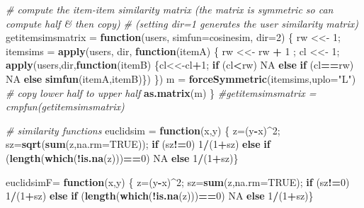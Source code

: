 \documentclass[]{article}
\newenvironment{Shaded}{\begin{snugshade}}{\end{snugshade}}
\newcommand{\CommentTok}[1]{\textcolor[rgb]{0.56,0.35,0.01}{\textit{#1}}}
\newcommand{\ControlFlowTok}[1]{\textcolor[rgb]{0.13,0.29,0.53}{\textbf{#1}}}
\newcommand{\DataTypeTok}[1]{\textcolor[rgb]{0.13,0.29,0.53}{#1}}
\newcommand{\DecValTok}[1]{\textcolor[rgb]{0.00,0.00,0.81}{#1}}
\newcommand{\KeywordTok}[1]{\textcolor[rgb]{0.13,0.29,0.53}{\textbf{#1}}}
\newcommand{\NormalTok}[1]{#1}
\newcommand{\OperatorTok}[1]{\textcolor[rgb]{0.81,0.36,0.00}{\textbf{#1}}}
\newcommand{\OtherTok}[1]{\textcolor[rgb]{0.56,0.35,0.01}{#1}}
\newcommand{\StringTok}[1]{\textcolor[rgb]{0.31,0.60,0.02}{#1}}
\begin{document}
\begin{Shaded}
\begin{Highlighting}[]
\CommentTok{# compute the item-item similarity matrix (the matrix is symmetric so can compute half & then copy)}
\CommentTok{# (setting dir=1 generates the user similarity matrix)}
\NormalTok{getitemsimsmatrix =}\StringTok{ }\ControlFlowTok{function}\NormalTok{(users, }\DataTypeTok{simfun=}\NormalTok{cosinesim, }\DataTypeTok{dir=}\DecValTok{2}\NormalTok{) \{}
\NormalTok{  rw <<-}\StringTok{ }\DecValTok{1}\NormalTok{; }
\NormalTok{  itemsims =}\StringTok{ }\KeywordTok{apply}\NormalTok{(users, dir, }\ControlFlowTok{function}\NormalTok{(itemA) \{}
\NormalTok{    rw <<-}\StringTok{ }\NormalTok{rw }\OperatorTok{+}\StringTok{ }\DecValTok{1}\NormalTok{ ; cl <<-}\StringTok{ }\DecValTok{1}\NormalTok{; }
    \KeywordTok{apply}\NormalTok{(users,dir,}\ControlFlowTok{function}\NormalTok{(itemB) \{cl<<-cl}\OperatorTok{+}\DecValTok{1}\NormalTok{; }\ControlFlowTok{if}\NormalTok{ (cl}\OperatorTok{<}\NormalTok{rw) }\OtherTok{NA} \ControlFlowTok{else} \ControlFlowTok{if}\NormalTok{ (cl}\OperatorTok{==}\NormalTok{rw) }\OtherTok{NA} \ControlFlowTok{else} \KeywordTok{simfun}\NormalTok{(itemA,itemB)\})}
\NormalTok{  \})}
\NormalTok{  m =}\StringTok{ }\KeywordTok{forceSymmetric}\NormalTok{(itemsims,}\DataTypeTok{uplo=}\StringTok{"L"}\NormalTok{) }\CommentTok{# copy lower half to upper half}
  \KeywordTok{as.matrix}\NormalTok{(m)}
\NormalTok{\}}
\CommentTok{#getitemsimsmatrix = cmpfun(getitemsimsmatrix)}

\CommentTok{# similarity functions}
\NormalTok{euclidsim =}\StringTok{ }\ControlFlowTok{function}\NormalTok{(x,y) \{ z=(y}\OperatorTok{-}\NormalTok{x)}\OperatorTok{^}\DecValTok{2}\NormalTok{; sz=}\KeywordTok{sqrt}\NormalTok{(}\KeywordTok{sum}\NormalTok{(z,}\DataTypeTok{na.rm=}\OtherTok{TRUE}\NormalTok{));}
                            \ControlFlowTok{if}\NormalTok{ (sz}\OperatorTok{!=}\DecValTok{0}\NormalTok{) }\DecValTok{1}\OperatorTok{/}\NormalTok{(}\DecValTok{1}\OperatorTok{+}\NormalTok{sz) }\ControlFlowTok{else} \ControlFlowTok{if}\NormalTok{ (}\KeywordTok{length}\NormalTok{(}\KeywordTok{which}\NormalTok{(}\OperatorTok{!}\KeywordTok{is.na}\NormalTok{(z)))}\OperatorTok{==}\DecValTok{0}\NormalTok{) }\OtherTok{NA} \ControlFlowTok{else} \DecValTok{1}\OperatorTok{/}\NormalTok{(}\DecValTok{1}\OperatorTok{+}\NormalTok{sz)\}}

\NormalTok{euclidsimF=}\StringTok{ }\ControlFlowTok{function}\NormalTok{(x,y) \{ z=(y}\OperatorTok{-}\NormalTok{x)}\OperatorTok{^}\DecValTok{2}\NormalTok{; sz=}\KeywordTok{sum}\NormalTok{(z,}\DataTypeTok{na.rm=}\OtherTok{TRUE}\NormalTok{);}
                            \ControlFlowTok{if}\NormalTok{ (sz}\OperatorTok{!=}\DecValTok{0}\NormalTok{) }\DecValTok{1}\OperatorTok{/}\NormalTok{(}\DecValTok{1}\OperatorTok{+}\NormalTok{sz) }\ControlFlowTok{else} \ControlFlowTok{if}\NormalTok{ (}\KeywordTok{length}\NormalTok{(}\KeywordTok{which}\NormalTok{(}\OperatorTok{!}\KeywordTok{is.na}\NormalTok{(z)))}\OperatorTok{==}\DecValTok{0}\NormalTok{) }\OtherTok{NA} \ControlFlowTok{else} \DecValTok{1}\OperatorTok{/}\NormalTok{(}\DecValTok{1}\OperatorTok{+}\NormalTok{sz)\} }


\end{Highlighting}
\end{Shaded}
\end{document}
